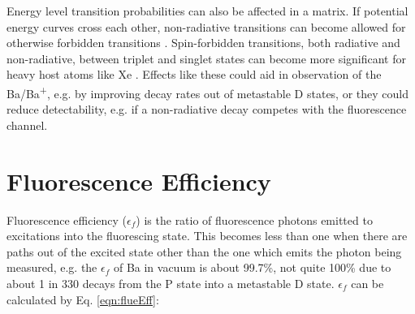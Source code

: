 

Energy level transition probabilities can also be affected in a matrix.  If potential energy curves cross each other, non-radiative transitions can become allowed for otherwise forbidden transitions \cite{crepin}.  Spin-forbidden transitions, both radiative and non-radiative, between triplet and singlet states can become more significant for heavy host atoms like Xe \cite{heavyAtom}.  Effects like these could aid in observation of the Ba/Ba\textsuperscript{+}, e.g. by improving decay rates out of metastable D states, or they could reduce detectability, e.g. if a non-radiative decay competes with the fluorescence channel.



\section{Fluorescence Efficiency}
\label{sec:fluorEff}

Fluorescence efficiency ($\epsilon_{f}$) is the ratio of fluorescence photons emitted to excitations into the fluorescing state.  This becomes less than one when there are paths out of the excited state other than the one which emits the photon being measured, e.g. the $\epsilon_{f}$ of Ba in vacuum is about 99.7\%, not quite 100\% due to about 1 in 330 decays from the P state into a metastable D state.  $\epsilon_{f}$ can be calculated by Eq. \ref{eqn:flueEff}:

